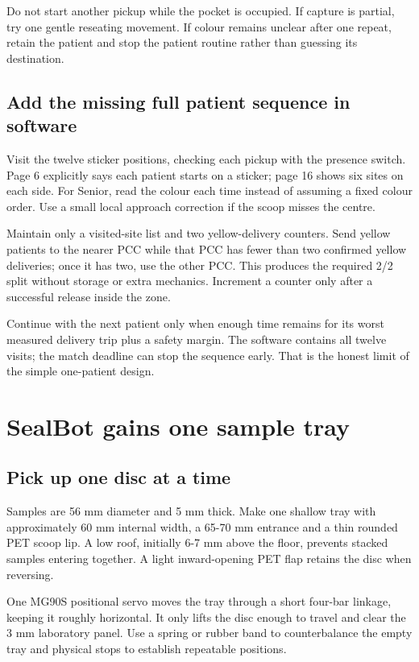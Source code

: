 \documentclass[10pt,a4paper]{article}
\begin{document}
Do not start another pickup while the pocket is occupied. If capture is partial, try one gentle reseating movement. If colour remains unclear after one repeat, retain the patient and stop the patient routine rather than guessing its destination.

\subsection{Add the missing full patient sequence in software}
Visit the twelve sticker positions, checking each pickup with the presence switch. Page 6 explicitly says each patient starts on a sticker; page 16 shows six sites on each side. For Senior, read the colour each time instead of assuming a fixed colour order. Use a small local approach correction if the scoop misses the centre.

Maintain only a visited-site list and two yellow-delivery counters. Send yellow patients to the nearer PCC while that PCC has fewer than two confirmed yellow deliveries; once it has two, use the other PCC. This produces the required 2/2 split without storage or extra mechanics. Increment a counter only after a successful release inside the zone.

Continue with the next patient only when enough time remains for its worst measured delivery trip plus a safety margin. The software contains all twelve visits; the match deadline can stop the sequence early. That is the honest limit of the simple one-patient design.

\section{SealBot gains one sample tray}
\subsection{Pick up one disc at a time}
Samples are 56 mm diameter and 5 mm thick. Make one shallow tray with approximately 60 mm internal width, a 65-70 mm entrance and a thin rounded PET scoop lip. A low roof, initially 6-7 mm above the floor, prevents stacked samples entering together. A light inward-opening PET flap retains the disc when reversing.

One MG90S positional servo moves the tray through a short four-bar linkage, keeping it roughly horizontal. It only lifts the disc enough to travel and clear the 3 mm laboratory panel. Use a spring or rubber band to counterbalance the empty tray and physical stops to establish repeatable positions.
\end{document}
